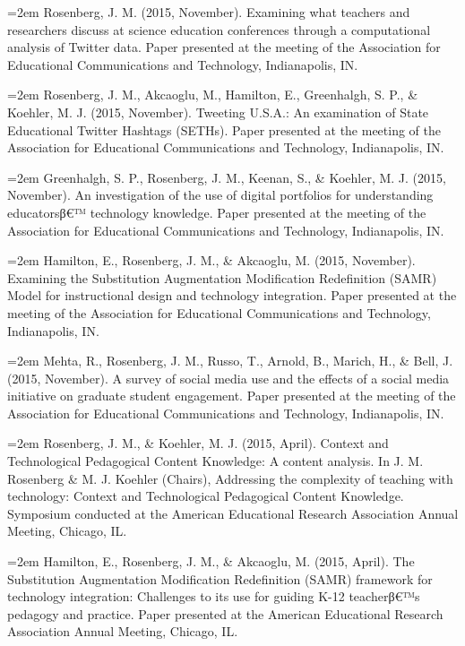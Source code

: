 \documentclass[]{article}
\newcommand{\euro}{€}
\begin{document}
\hangindent=2em Rosenberg, J. M. (2015, November). Examining what
teachers and researchers discuss at science education conferences
through a computational analysis of Twitter data. Paper presented at the
meeting of the Association for Educational Communications and
Technology, Indianapolis, IN.

\hangindent=2em Rosenberg, J. M., Akcaoglu, M., Hamilton, E.,
Greenhalgh, S. P., \& Koehler, M. J. (2015, November). Tweeting U.S.A.:
An examination of State Educational Twitter Hashtags (SETHs). Paper
presented at the meeting of the Association for Educational
Communications and Technology, Indianapolis, IN.

\hangindent=2em Greenhalgh, S. P., Rosenberg, J. M., Keenan, S., \&
Koehler, M. J. (2015, November). An investigation of the use of digital
portfolios for understanding educatorsβ\euro{}™ technology knowledge.
Paper presented at the meeting of the Association for Educational
Communications and Technology, Indianapolis, IN.

\hangindent=2em Hamilton, E., Rosenberg, J. M., \& Akcaoglu, M. (2015,
November). Examining the Substitution Augmentation Modification
Redefinition (SAMR) Model for instructional design and technology
integration. Paper presented at the meeting of the Association for
Educational Communications and Technology, Indianapolis, IN.

\hangindent=2em Mehta, R., Rosenberg, J. M., Russo, T., Arnold, B.,
Marich, H., \& Bell, J. (2015, November). A survey of social media use
and the effects of a social media initiative on graduate student
engagement. Paper presented at the meeting of the Association for
Educational Communications and Technology, Indianapolis, IN.

\hangindent=2em Rosenberg, J. M., \& Koehler, M. J. (2015, April).
Context and Technological Pedagogical Content Knowledge: A content
analysis. In J. M. Rosenberg \& M. J. Koehler (Chairs), Addressing the
complexity of teaching with technology: Context and Technological
Pedagogical Content Knowledge. Symposium conducted at the American
Educational Research Association Annual Meeting, Chicago, IL.

\hangindent=2em Hamilton, E., Rosenberg, J. M., \& Akcaoglu, M. (2015,
April). The Substitution Augmentation Modification Redefinition (SAMR)
framework for technology integration: Challenges to its use for guiding
K-12 teacherβ\euro{}™s pedagogy and practice. Paper presented at the
American Educational Research Association Annual Meeting, Chicago, IL.
\end{document}
